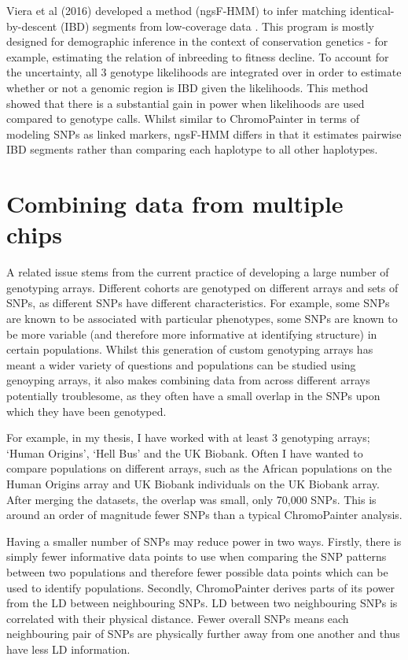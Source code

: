 Viera et al (2016) developed a method (ngsF-HMM) to infer matching identical-by-descent (IBD) segments from low-coverage data \cite{Vieira2016}. This program is mostly designed for demographic inference in the context of conservation genetics - for example, estimating the relation of inbreeding to fitness decline. To account for the uncertainty, all 3 genotype likelihoods are integrated over in order to estimate whether or not a genomic region is IBD given the likelihoods. This method showed that there is a substantial gain in power when likelihoods are used compared to genotype calls. Whilst similar to ChromoPainter in terms of modeling SNPs as linked markers, ngsF-HMM differs in that it estimates pairwise IBD segments rather than comparing each haplotype to all other haplotypes.

\section{Combining data from multiple chips}

A related issue stems from the current practice of developing a large number of genotyping arrays. Different cohorts are genotyped on different arrays and sets of SNPs, as different SNPs have different characteristics. For example, some SNPs are known to be associated with particular phenotypes, some SNPs are known to be more variable (and therefore more informative at identifying structure) in certain populations. Whilst this generation of custom genotyping arrays has meant a wider variety of questions and populations can be studied using genoyping arrays, it also makes combining data from across different arrays potentially troublesome, as they often have a small overlap in the SNPs upon which they have been genotyped.

For example, in my thesis, I have worked with at least 3 genotyping arrays; `Human Origins', `Hell Bus' and the UK Biobank. Often I have wanted to compare populations on different arrays, such as the African populations on the Human Origins array and UK Biobank individuals on the UK Biobank array. After merging the datasets, the overlap was small, only 70,000 SNPs. This is around an order of magnitude fewer SNPs than a typical ChromoPainter analysis. 

Having a smaller number of SNPs may reduce power in two ways. Firstly, there is simply fewer informative data points to use when comparing the SNP patterns between two populations and therefore fewer possible data points which can be used to identify populations. Secondly, ChromoPainter derives parts of its power from the LD between neighbouring SNPs. LD between two neighbouring SNPs is correlated with their physical distance. Fewer overall SNPs means each neighbouring pair of SNPs are physically further away from one another and thus have less LD information. 

